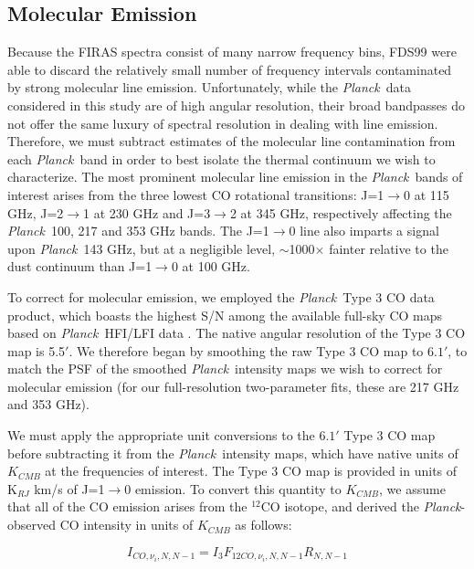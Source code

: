 \documentclass{emulateapj}
\newcommand{\PLANCK}{{\it Planck}}
\begin{document}
\subsection{Molecular Emission}
Because the FIRAS spectra consist of many narrow frequency bins, FDS99 were
able to discard the relatively small number of frequency intervals contaminated
by strong molecular line emission. Unfortunately, while the \PLANCK~data 
considered in this study are of high angular resolution, their broad bandpasses
do not offer the same luxury of spectral resolution in dealing with line 
emission. Therefore, we must subtract estimates of the molecular line 
contamination from each \PLANCK~band in order to best isolate the thermal 
continuum we wish to characterize. The most prominent molecular line emission 
in the \PLANCK~bands of interest arises from the three lowest CO rotational
transitions: J=1$\rightarrow$0 at 115 GHz, J=2$\rightarrow$1 at 230 GHz and 
J=3$\rightarrow$2 at 345 GHz, respectively affecting the \PLANCK~100, 217 and 
353 GHz bands. The J=1$\rightarrow$0 line also imparts a signal upon 
\PLANCK~143 GHz, but at a negligible level, $\sim$1000$\times$ fainter relative
to the dust continuum than J=1$\rightarrow$0 at 100 GHz.

To correct for molecular emission, we employed the \PLANCK~Type 3 CO 
data product, which boasts the highest S/N 
among the available full-sky CO maps based on \PLANCK~HFI/LFI 
data \citep{planckco}. The native angular resolution of the Type 3 CO map is 
5.5$'$. We therefore began by smoothing the raw Type 3 CO map to $6.1'$, to 
match the PSF of the smoothed \PLANCK~intensity maps we wish to correct 
for molecular emission (for our full-resolution two-parameter fits, these are 
217 GHz and 353 GHz). 


We must apply the appropriate unit conversions to the $6.1'$ Type 3 CO
map before subtracting it from the \PLANCK~intensity maps, which have native 
units of $K_{CMB}$ at the frequencies of interest. The Type 3 CO map is 
provided in units of K$_{RJ}$ km/s of J=1$\rightarrow$0 emission. To convert 
this quantity to $K_{CMB}$, we assume that all of the CO emission arises from 
the $^{12}$CO isotope, and derived the \PLANCK-observed CO intensity in units 
of $K_{CMB}$ as follows:

\begin{equation}
I_{CO, \nu_i, N, N-1} = I_{3}F_{12CO, \nu_i, N, N-1} R_{N, N-1}
\end{equation}
\end{document}

